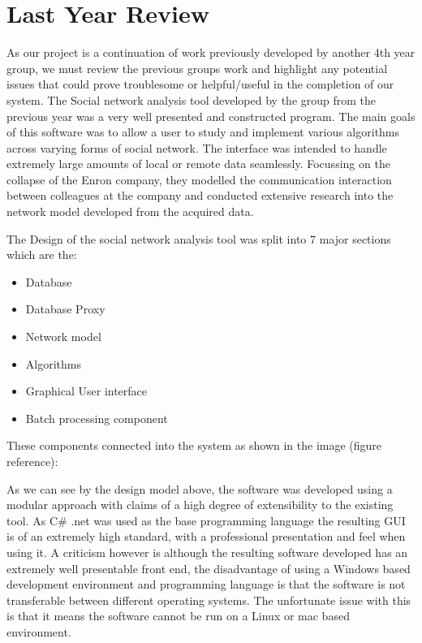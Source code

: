 \chapter{Last Year Review}

As our project is a continuation of work previously developed by another 4th year group, we must review the previous groups work and highlight any potential issues that could prove troublesome or helpful/useful in the completion of our system. The Social network analysis tool developed by the group from the previous year was a very well presented and constructed program. The main goals of this software was to allow a user to study and implement various algorithms across varying forms of social network. The interface was intended to handle extremely large amounts of local or remote data seamlessly. Focussing on the collapse of the Enron company, they modelled the communication interaction between colleagues at the company and conducted extensive research into the network model developed from the acquired data. 

The Design of the social network analysis tool was split into 7 major sections which are the:

\begin{itemize}
\item Database
\item Database Proxy
\item Network model
\item Algorithms
\item Graphical User interface
\item Batch processing component
\end{itemize}

These components connected into the system as shown in the image (figure reference):

As we can see by the design model above, the software was developed using a modular approach with claims of a high degree of extensibility to the existing tool. As C\# .net was used as the base programming language the resulting GUI is of an extremely high standard, with a professional presentation and feel when using it. A criticism however is although the resulting software developed has an extremely well presentable front end, the disadvantage of using a Windows based development environment and programming language is that the software is not transferable between different operating systems. The unfortunate issue with this is that it means the software cannot be run on a Linux or mac based environment. 

